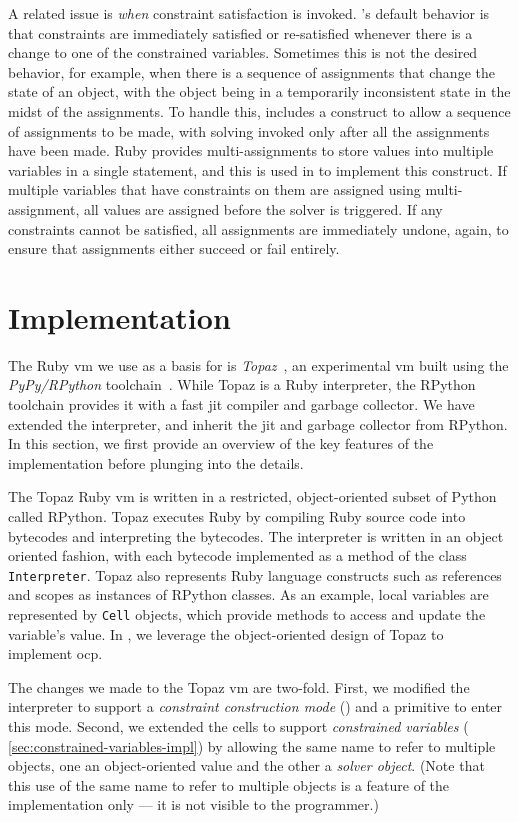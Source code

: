 A related issue is \emph{when} constraint satisfaction is invoked.
\langname's default behavior is that constraints are immediately
satisfied or re-satisfied whenever there is a change to one of the
constrained variables.  Sometimes this is not the desired behavior,
for example, when there is a sequence of assignments that change the
state of an object, with the object being in a temporarily
inconsistent state in the midst of the assignments.  To handle this,
\langname includes a construct to allow a sequence of assignments to
be made, with solving invoked only after all the assignments have been
made.  Ruby provides multi-assignments to store values into multiple
variables in a single statement, and this is used in \toolname to
implement this construct.  If multiple variables that have constraints
on them are assigned using multi-assignment, all values are assigned
before the solver is triggered. If any constraints cannot be
satisfied, all assignments are immediately undone, again, to ensure
that assignments either succeed or fail entirely.

\section{Implementation}
\label{sec:implementation}
The Ruby \ac{vm} we use as a basis for \toolname is
\emph{Topaz}~\cite{FelgentreffTopazWroclove2013}, an experimental
\ac{vm} built using the \emph{PyPy/RPython}
toolchain~\cite{rigo2006pypy}. While Topaz is a Ruby interpreter, the
RPython toolchain provides it with a fast \ac{jit} compiler and
garbage collector. We have extended the interpreter, and inherit the
\ac{jit} and garbage collector from RPython. In this section, we first
provide an overview of the key features of the implementation before
plunging into the details.

The Topaz Ruby \ac{vm} is written in a restricted, object-oriented
subset of Python called RPython. Topaz executes Ruby by compiling Ruby
source code into bytecodes and interpreting the bytecodes. The interpreter is
written in an object oriented fashion, with each bytecode implemented
as a method of the class \lstinline{Interpreter}. Topaz also
represents Ruby language constructs such as references and scopes as
instances of RPython classes. As an example, local variables are
represented by \lstinline{Cell} objects, which provide methods to
access and update the variable's value.  In \toolname, we leverage the
object-oriented design of Topaz to implement \ac{ocp}.

The changes we made to the Topaz \ac{vm} are two-fold.  First, we
modified the interpreter to support a \emph{constraint construction
  mode} () and a
primitive to enter this mode.  Second, we extended the cells to
support \emph{constrained variables} (\cf
{\autoref{sec:constrained-variables-impl}}) by allowing the same name
to refer to multiple objects, one an object-oriented value and the
other a \emph{solver object}.  (Note that this use of the same name to refer
to multiple objects is a feature of the implementation only --- it is
not visible to the programmer.)

